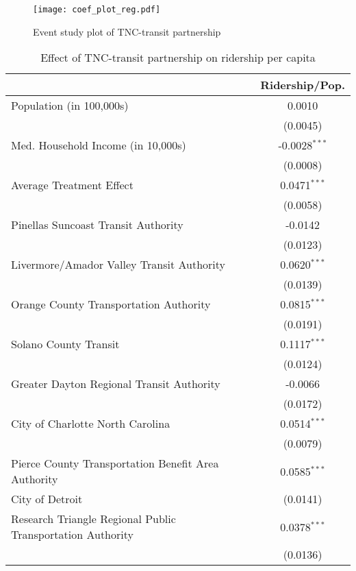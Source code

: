 \documentclass [12pt]{report}
\begin{document}

\begin{figure}[H]
    \centering
    \texttt{[image: coef\_plot\_reg.pdf]} %
    \caption{Event study plot of TNC-transit partnership}
\end{figure}
\begin{table}[H]
\centering 
\tiny
\caption{Effect of TNC-transit partnership on ridership per capita}
\begin{tabular}{lc}
   \tabularnewline \midrule
   \midrule
   & Ridership/Pop. \\   
   \midrule
   Population (in 100,000s) & 0.0010 \\
   & (0.0045)\\
   \midrule
   Med. Household Income (in 10,000s) & -0.0028$^{***}$ \\
   & (0.0008)\\
   \midrule
   Average Treatment Effect & 0.0471$^{***}$\\
   & (0.0058)\\
   \midrule
   Pinellas Suncoast Transit Authority & -0.0142\\   
   & (0.0123) \\   
   \midrule
   Livermore/Amador Valley Transit Authority & 0.0620$^{***}$ \\   
   & (0.0139) \\   
   \midrule
   Orange County Transportation Authority & 0.0815$^{***}$ \\   
   & (0.0191) \\   
   \midrule
   Solano County Transit & 0.1117$^{***}$ \\   
   & (0.0124)\\   
   \midrule
   Greater Dayton Regional Transit Authority & -0.0066 \\   
   & (0.0172)\\  
   \midrule
   City of Charlotte North Carolina & 0.0514$^{***}$ \\   
   & (0.0079) \\   
   \midrule
   Pierce County Transportation Benefit Area Authority & 0.0585$^{***}$ \\   
   City of Detroit & (0.0141) \\   
   \midrule
   Research Triangle Regional Public Transportation Authority & 0.0378$^{***}$\\   
   & (0.0136) \\    

\end{tabular}
\end{table}
\end{document}
